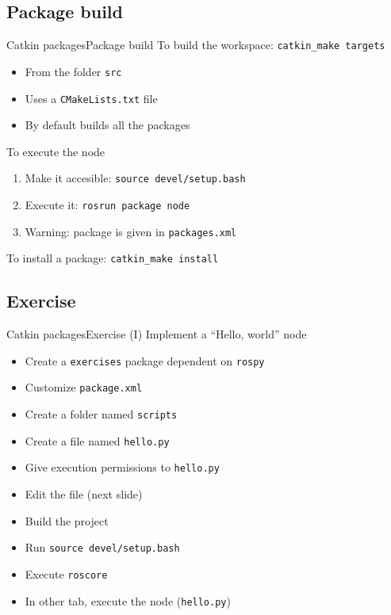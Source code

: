 \documentclass[10pt,compress]{beamer} %
\begin{document}
\subsection{Package build}
\begin{frame}[fragile]{Catkin packages}{Package build}
	To build the workspace: \texttt{catkin\_make targets}
	\begin{itemize}
		\item From the folder \texttt{src}
		\item Uses a \texttt{CMakeLists.txt} file
		\item By default builds all the packages
	\end{itemize}
	To execute the node
	\begin{enumerate}
		\item Make it accesible: \texttt{source devel/setup.bash}
		\item Execute it: \texttt{rosrun package node}
		\item[] Warning: package is given in \texttt{packages.xml}
	\end{enumerate}
	To install a package: \texttt{catkin\_make install}
\end{frame}

\subsection{Exercise}
\begin{frame}[fragile]{Catkin packages}{Exercise (I)}
	Implement a ``Hello, world'' node
	\begin{itemize}
		\item Create a \texttt{exercises} package dependent on \texttt{rospy}
		\item Customize \texttt{package.xml}
		\item Create a folder named \texttt{scripts}
		\item Create a file named \texttt{hello.py}
		\item Give execution permissions to \texttt{hello.py}
		\item Edit the file (next slide)
		\item Build the project
		\item Run \texttt{source devel/setup.bash}
		\item Execute \texttt{roscore}
		\item In other tab, execute the node (\texttt{hello.py})
	\end{itemize}
\end{frame}
\end{document}
